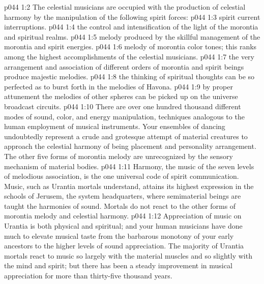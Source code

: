\vs p044 1:2 The celestial musicians are occupied with the production of celestial harmony by the manipulation of the following spirit forces:
\pc \vs p044 1:3 \bibnobreakspace {}spirit current interruptions.
\pc \vs p044 1:4 \bibnobreakspace {}the control and intensification of the light of the morontia and spiritual realms.
\pc \vs p044 1:5 \bibnobreakspace {}melody produced by the skillful management of the morontia and spirit energies.
\pc \vs p044 1:6 \bibnobreakspace {}melody of morontia color tones; this ranks among the highest accomplishments of the celestial musicians.
\pc \vs p044 1:7 \bibnobreakspace {}the very arrangement and association of different orders of morontia and spirit beings produce majestic melodies.
\pc \vs p044 1:8 \bibnobreakspace {}the thinking of spiritual thoughts can be so perfected as to burst forth in the melodies of Havona.
\pc \vs p044 1:9 \bibnobreakspace {}by proper attunement the melodies of other spheres can be picked up on the universe broadcast circuits.
\pc \vs p044 1:10 There are over one hundred thousand different modes of sound, color, and energy manipulation, techniques analogous to the human employment of musical instruments. Your ensembles of dancing undoubtedly represent a crude and grotesque attempt of material creatures to approach the celestial harmony of being placement and personality arrangement. The other five forms of morontia melody are unrecognized by the sensory mechanism of material bodies.
\vs p044 1:11 Harmony, the music of the seven levels of melodious association, is the one universal code of spirit communication. Music, such as Urantia mortals understand, attains its highest expression in the schools of Jerusem, the system headquarters, where semimaterial beings are taught the harmonies of sound. Mortals do not react to the other forms of morontia melody and celestial harmony.
\pc \vs p044 1:12 Appreciation of music on Urantia is both physical and spiritual; and your human musicians have done much to elevate musical taste from the barbarous monotony of your early ancestors to the higher levels of sound appreciation. The majority of Urantia mortals react to music so largely with the material muscles and so slightly with the mind and spirit; but there has been a steady improvement in musical appreciation for more than thirty\hyp{}five thousand years.
